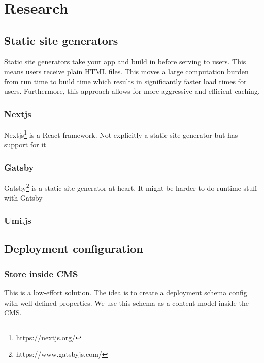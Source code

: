 \chapter{Research} %

\label{Chapter2} 


\section{Static site generators}

Static site generators take your app and build in before serving to users. 
This means users receive plain HTML files. This moves a large computation burden from run time to build time which results in significantly faster load times for users.
Furthermore, this approach allows for more aggressive and efficient caching.

\subsection{Nextjs}

Nextjs\footnote{https://nextjs.org/} is a React framework. Not explicitly a static site generator but has support for it

\subsection{Gatsby}

Gatsby\footnote{https://www.gatsbyjs.com/} is a static site generator at heart. It might be harder to do runtime stuff with Gatsby

\subsection{Umi.js}


\section{Deployment configuration}

\subsection{Store inside CMS}

This is a low-effort solution. The idea is to create a deployment schema config with well-defined properties. We use this schema as a content model inside the CMS.

